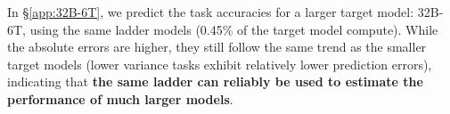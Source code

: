 In \S\ref{app:32B-6T}, we predict the task accuracies for a larger \basemodelname{} target model: 32B-6T, using the same ladder models (0.45\% of the target model compute). While the absolute errors are higher, they still follow the same trend as the smaller target models (lower variance tasks exhibit relatively lower prediction errors), indicating that \textbf{the same ladder can reliably be used to estimate the performance of much larger models}.




